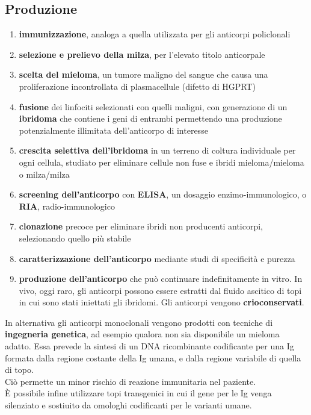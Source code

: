 \documentclass[a4paper, 12pt]{article}
\begin{document}
\subsection{Produzione}
\begin{enumerate}
\item \textbf{immunizzazione}, analoga a quella utilizzata per gli anticorpi policlonali
\item \textbf{selezione e prelievo della milza}, per l'elevato titolo anticorpale
\item \textbf{scelta del mieloma}, un tumore maligno del sangue che causa una proliferazione incontrollata di plasmacellule (difetto di HGPRT)
\item \textbf{fusione} dei linfociti selezionati con quelli maligni, con generazione di un \textbf{ibridoma} che contiene i geni di entrambi permettendo una produzione potenzialmente illimitata dell'anticorpo di interesse
\item \textbf{crescita selettiva dell'ibridoma} in un terreno di coltura individuale per ogni cellula, studiato per eliminare cellule non fuse e ibridi mieloma/mieloma o milza/milza
\item \textbf{screening dell'anticorpo} con \textbf{ELISA}, un dosaggio enzimo-immunologico, o \textbf{RIA}, radio-immunologico
\item \textbf{clonazione} precoce per eliminare ibridi non producenti anticorpi, selezionando quello più stabile
\item \textbf{caratterizzazione dell'anticorpo} mediante studi di specificità e purezza
\item \textbf{produzione dell'anticorpo} che può continuare indefinitamente in vitro. In vivo, oggi raro, gli anticorpi possono essere estratti dal fluido ascitico di topi in cui sono stati iniettati gli ibridomi. Gli anticorpi vengono \textbf{crioconservati}.
\end{enumerate}
In alternativa gli anticorpi monoclonali vengono prodotti con tecniche di \textbf{ingegneria genetica}, ad esempio qualora non sia disponibile un mieloma adatto. Essa prevede la sintesi di un DNA ricombinante codificante per una Ig formata dalla regione costante della Ig umana, e dalla regione variabile di quella di topo.\\
Ciò permette un minor rischio di reazione immunitaria nel paziente.\\
È possibile infine utilizzare topi transgenici in cui il gene per le Ig venga silenziato e sostiuito da omologhi codificanti per le varianti umane.
\end{document}
